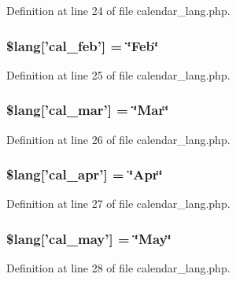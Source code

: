 Definition at line 24 of file calendar\-\_\-lang.\-php.

\subsubsection[{\$lang}]{\setlength{\rightskip}{0pt plus 5cm}\$lang['cal\-\_\-feb'] = \char`\"{}Feb\char`\"{}}\label{calendar__lang_8php_ac26ad55691325913e5d0f7156c95ff18}


Definition at line 25 of file calendar\-\_\-lang.\-php.

\subsubsection[{\$lang}]{\setlength{\rightskip}{0pt plus 5cm}\$lang['cal\-\_\-mar'] = \char`\"{}Mar\char`\"{}}\label{calendar__lang_8php_a22ee24632deb286ad4efb833e2fe7533}


Definition at line 26 of file calendar\-\_\-lang.\-php.

\subsubsection[{\$lang}]{\setlength{\rightskip}{0pt plus 5cm}\$lang['cal\-\_\-apr'] = \char`\"{}Apr\char`\"{}}\label{calendar__lang_8php_a61653bb502ac4775a4186ae145e9ff78}


Definition at line 27 of file calendar\-\_\-lang.\-php.

\subsubsection[{\$lang}]{\setlength{\rightskip}{0pt plus 5cm}\$lang['cal\-\_\-may'] = \char`\"{}May\char`\"{}}\label{calendar__lang_8php_a7e77a974617dd3fd0ab8d66f59125fdb}


Definition at line 28 of file calendar\-\_\-lang.\-php.

